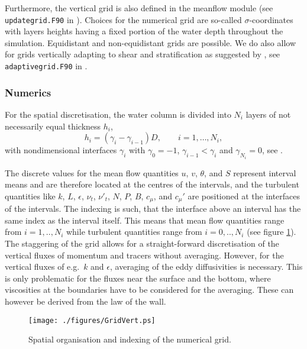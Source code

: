 Furthermore, the vertical grid is also defined in the meanflow module
(see {\tt updategrid.F90} in ). Choices for the
numerical grid are so-called $\sigma$-coordinates with layers
heights having a fixed portion of the water depth throughout the
simulation. Equidistant and non-equidistant grids are possible.  We
do also allow for grids vertically adapting to shear and
stratification as suggested by \cite{BurchardBeckers2003}, see {\tt
adaptivegrid.F90} in .

\subsubsection{Numerics}\label{SectionNumericsMean}

For the spatial discretisation, the water column is divided into $N_i$
layers of not necessarily equal thickness $h_i$,
\begin{equation}
  \label{grid}
   h_i=(\gamma_i-\gamma_{i-1})D, \qquad i=1,\dots,N_i
   \comma
\end{equation}
with nondimensional interfaces $\gamma_i$ with $\gamma_0=-1$,
$\gamma_{i-1}< \gamma_i$ and $\gamma_{N_i}=0$,
see \cite{BurchardPetersen97}.

The discrete values for the mean flow quantities $u$, $v$, $\theta$,
and $S$ represent interval means and are therefore located at the
centres of the intervals, and the turbulent quantities like $k$, $L$,
$\epsilon$, $\nu_t$, $\nu'_t$, $N$, $P$, $B$, $c_{\mu}$, and $c_{\mu}'$
are positioned at the interfaces of the intervals.  The indexing is
such, that the interface above an interval has the same index as the
interval itself.  This means that mean flow quantities range from
$i=1,..,N_i$ while turbulent quantities range from $i=0,..,N_i$ (see
figure \ref{FigGrid}).  The staggering of the grid allows for a
straight-forward discretisation of the vertical fluxes of momentum
and tracers without averaging.  However, for the vertical fluxes of
e.g.\ $k$ and $\epsilon$, averaging of the eddy diffusivities is
necessary. This is only problematic for the fluxes near the surface
and the bottom, where viscosities at the boundaries have to be
considered for the averaging. These can however be derived from the
law of the wall.

\begin{figure}
\begin{center}
\texttt{[image: ./figures/GridVert.ps]}
\caption{Spatial organisation and indexing of the numerical grid.
}\label{FigGrid}
\end{center}
\end{figure}

